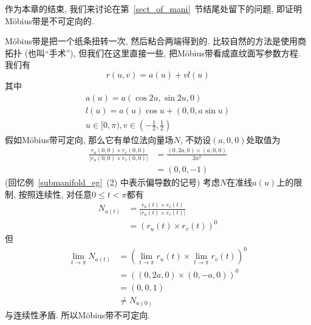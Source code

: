 作为本章的结束, 我们来讨论在第~\ref{sect_of_mani}~节结尾处留下的问题, 即证明M\"{o}bius带是不可定向的.
\begin{eg}
    M\"{o}bius带是把一个纸条扭转一次, 然后粘合两端得到的.
    比较自然的方法是使用商拓扑 (也叫``手术''), 但我们在这里直接一些, 把M\"{o}bius带看成直纹面写参数方程.
    我们有
    \[r(u,v)=a(u)+vl(u)\]
    其中
    \begin{gather*}
        a(u)=a(\cos{2u},\sin{2u},0)\\
        l(u)=a(u)\cos{u}+(0,0,a\sin{u})\\
        u\in[0,\pi),v\in\left(-\frac{1}{2},\frac{1}{2}\right)
    \end{gather*}
    假如M\"{o}bius带可定向, 那么它有单位法向量场$N$, 不妨设$(a,0,0)$处取值为
    \begin{align*}
        \frac{r_u(0,0)\times r_v(0,0)}{|r_u(0,0)\times r_v(0,0)|}&=\frac{(0,2a,0)\times(a,0,0)}{2a^2}\\
        &=(0,0,-1)
    \end{align*}
    (回忆例~\ref{submanifold_eg}~(2) 中表示偏导数的记号)
    考虑$N$在准线$a(u)$上的限制, 按照连续性, 对任意$0\leq t<\pi$都有
    \begin{align*}
        N_{a(t)}&=\frac{r_u(t)\times r_v(t)}{|r_u(t)\times r_v(t)|}\\
        &=(r_u(t)\times r_v(t))^0
    \end{align*}
    但
    \begin{align*}
        \lim_{t\to\pi}N_{a(t)}&=\left(\lim_{t\to\pi}r_u(t)\times\lim_{t\to\pi}r_v(t)\right)^0\\
        &=((0,2a,0)\times(0,-a,0))^0\\
        &=(0,0,1)\\
        &\neq N_{a(0)}
    \end{align*}
    与连续性矛盾.
    所以M\"{o}bius带不可定向.
\end{eg}
\blank